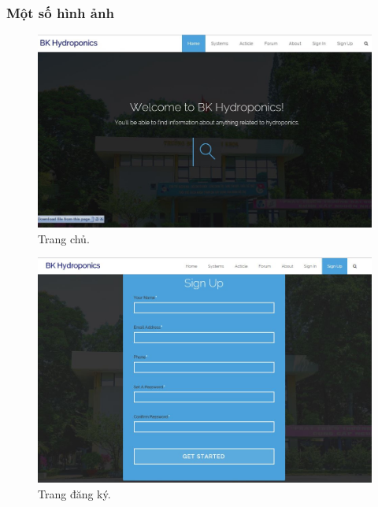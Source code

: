 \documentclass[a4paper,12pt,oneside]{article}
\begin{document}
\subsubsection{Một số hình ảnh}
\begin{center}

\begin{figure}[H]
\begin{center}
\includegraphics[scale=.5]{hinh/web_home.jpg}
\end{center}
\caption{Trang chủ.}
\end{figure}

\begin{figure}[H]
\begin{center}
\includegraphics[scale=.6]{hinh/web_register.jpg}
\end{center}
\caption{Trang đăng ký.}
\end{figure}


\end{center}
\end{document}
